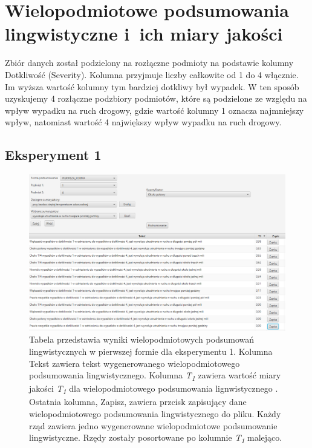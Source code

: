 \documentclass{classrep}
\begin{document}
\section{Wielopodmiotowe podsumowania lingwistyczne i~ich miary jakości}
\label{section:ex_wiel}

Zbiór danych został podzielony na rozłączne podmioty na podstawie kolumny Dotkliwość (Severity). Kolumna przyjmuje liczby całkowite od 1 do 4 włącznie. Im wyższa wartość kolumny tym bardziej dotkliwy był wypadek. W ten sposób uzyskujemy 4 rozłączne podzbiory podmiotów, które są podzielone ze względu na wpływ wypadku na ruch drogowy, gdzie wartość kolumny 1 oznacza najmniejszy wpływ, natomiast wartość 4 największy wpływ wypadku na ruch drogowy.


\subsection{Eksperyment 1}
\label{section:ex_wiel1}

\begin{figure}[h!]
\centering
\includegraphics[width=15cm]{ex_wiel1.png}
\vspace{-0.3cm}
\caption{Tabela przedstawia wyniki wielopodmiotowych podsumowań lingwistycznych w pierwszej formie dla eksperymentu 1. Kolumna Tekst zawiera tekst wygenerowanego wielopodmiotowego podsumowania lingwistycznego. Kolumna \textit{T\textsubscript{1}} zawiera wartość miary jakości \textit{T\textsubscript{1}} dla wielopodmiotowego podsumowania lignwistycznego \cite{niewiadomski19}. Ostatnia kolumna, Zapisz, zawiera przcisk zapisujący dane wielopodmiotowego podsumowania lingwistycznego do pliku. Każdy rząd zawiera jedno wygenerowane wielopodmiotowe podsumowanie lingwistyczne. Rzędy zostały posortowane po kolumnie \textit{T\textsubscript{1}} malejąco. }
\label{wykr_ex_wiel1}
\end{figure}
\newpage
\end{document}
